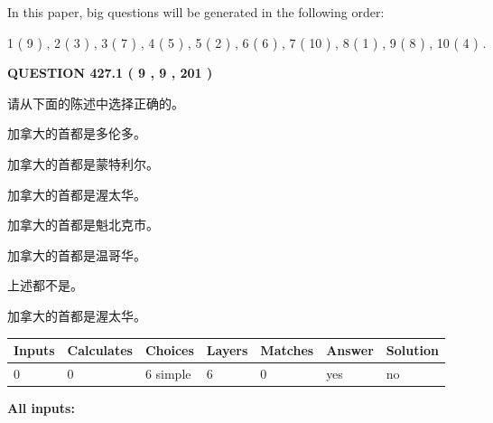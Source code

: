 \documentclass{ctexart}
\begin{document}
In this paper, big questions will be generated in the following order: 
   
   
   1 ( 9 )
 ,
   2 ( 3 )
 ,
   3 ( 7 )
 ,
   4 ( 5 )
 ,
   5 ( 2 )
 ,
   6 ( 6 )
 ,
   7 ( 10 )
 ,
   8 ( 1 )
 ,
   9 ( 8 )
 ,
   10 ( 4 )
 .
  
\vspace{0.2in}
  
{\textbf{\Large{QUESTION
427.1 
 ( 9 , 9 , 201 )
}}}
  
  
请从下面的陈述中选择正确的。
 
 
加拿大的首都是多伦多。
 
 
加拿大的首都是蒙特利尔。
 
 
加拿大的首都是渥太华。
 
 
加拿大的首都是魁北克市。
 
 
加拿大的首都是温哥华。
 
 
 上述都不是。
 
 
\noindent{}
 
 
加拿大的首都是渥太华。
 
 
\noindent{}
 
 
   
   
   
   
\noindent\begin{tabular}{|l|l|l|l|l|l|l|}
 \hline
Inputs & Calculates & Choices & Layers & Matches & Answer & Solution \\ \hline
 0  & 
 0  & 
 6
  simple  
  & 
 6  & 
 0  & 
  yes & 
  no 
  \\ \hline
 \end{tabular}
   
   
   
   
\noindent{}
   
   
   
   
\noindent\vspace{0.1in}\hspace{-0.08in} {\textbf{\Large{All inputs: }}}
   
   
  
\end{document}
